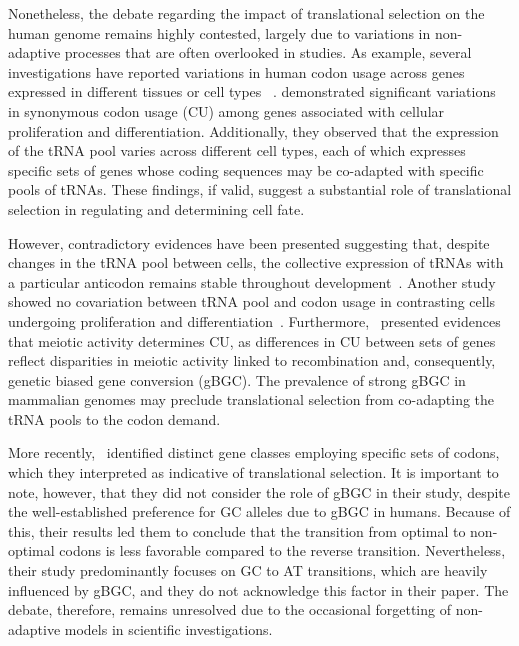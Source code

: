 Nonetheless, the debate regarding the impact of translational selection on the human genome remains highly contested, largely due to variations in non-adaptive processes that are often overlooked in studies. 
As example, several investigations have reported variations in human codon usage across genes expressed in different tissues or cell types ~\citep{vinogradov_dna_2003, plotkin_tissue-specific_2004, gingold_dual_2014}. \citet{gingold_dual_2014} demonstrated significant variations in synonymous codon usage (\acrshort{CU}) among genes associated with cellular proliferation and differentiation. Additionally, they observed that the expression of the \acrshort{tRNA} pool varies across different cell types, each of which expresses specific sets of genes whose coding sequences may be co-adapted with specific pools of \acrshort{tRNA}s. These findings, if valid, suggest a substantial role of translational selection in regulating and determining cell fate.

However, contradictory evidences have been presented suggesting that, despite changes in the tRNA pool between cells, the collective expression of tRNAs with a particular anticodon remains stable throughout development~\citep{schmitt_high-resolution_2014}. Another study showed no covariation between tRNA pool and codon usage in contrasting cells undergoing proliferation and differentiation~\citep{rudolph_codon-driven_2016}. Furthermore,~\citet{pouyet_recombination_2017} presented evidences that meiotic activity determines CU, as differences in CU between sets of genes reflect disparities in meiotic activity linked to recombination and, consequently, genetic \gls{biased gene conversion} (\acrshort{gBGC}). The prevalence of strong \acrshort{gBGC} in mammalian genomes may preclude translational selection from co-adapting the \acrshort{tRNA} pools to the codon demand.

More recently,~\citet{dhindsa_natural_2020} identified distinct gene classes employing specific sets of codons, which they interpreted as indicative of translational selection. It is important to note, however, that they did not consider the role of \acrshort{gBGC} in their study, despite the well-established preference for GC \gls{allele}s due to \acrshort{gBGC} in humans. Because of this, their results led them to conclude that the transition from optimal to non-optimal codons is less favorable compared to the reverse transition. Nevertheless, their study predominantly focuses on GC to AT transitions, which are heavily influenced by \acrshort{gBGC}, and they do not acknowledge this factor in their paper. The debate, therefore, remains unresolved due to the occasional forgetting of non-adaptive models in scientific investigations.


